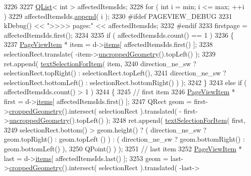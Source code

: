\begin{DoxyCode}
3226 
3227         \hyperlink{classQList}{QList}< \textcolor{keywordtype}{int} > affectedItemsIds;
3228         for ( \textcolor{keywordtype}{int} i = min; i <= max; ++i )
3229             affectedItemsIds.\hyperlink{generator__pdf_8cpp_af89a069d971b564171ae5c9bc238c420}{append}( i );
3230 \textcolor{preprocessor}{#ifdef PAGEVIEW\_DEBUG}
3231         kDebug() << \textcolor{stringliteral}{">>>> pages:"} << affectedItemsIds;
3232 \textcolor{preprocessor}{#endif}
3233         firstpage = affectedItemsIds.first();
3234 
3235         \textcolor{keywordflow}{if} ( affectedItemsIds.count() == 1 )
3236         \{
3237             \hyperlink{classPageViewItem}{PageViewItem} * item = d->\hyperlink{classPageViewPrivate_ad90c795dead9abfaa5818a94e00435bc}{items}[ affectedItemsIds.first() ];
3238             selectionRect.translate( -item->\hyperlink{classPageViewItem_a5d2e73a003f65b4e95c0c21b1698f835}{uncroppedGeometry}().topLeft() );
3239             ret.append( \hyperlink{classPageView_ace30a37c79e7cd9b523a6cd4fd74f5ae}{textSelectionForItem}( item,
3240                 direction\_ne\_sw ? selectionRect.topRight() : selectionRect.topLeft(),
3241                 direction\_ne\_sw ? selectionRect.bottomLeft() : selectionRect.bottomRight() ) );
3242         \}
3243         \textcolor{keywordflow}{else} \textcolor{keywordflow}{if} ( affectedItemsIds.count() > 1 )
3244         \{
3245             \textcolor{comment}{// first item}
3246             \hyperlink{classPageViewItem}{PageViewItem} * first = d->\hyperlink{classPageViewPrivate_ad90c795dead9abfaa5818a94e00435bc}{items}[ affectedItemsIds.first() ];
3247             QRect geom = first->\hyperlink{classPageViewItem_aa2c3e988ccbe9ee162b73d7f89ab0d02}{croppedGeometry}().intersect( selectionRect ).translated( -
      first->\hyperlink{classPageViewItem_a5d2e73a003f65b4e95c0c21b1698f835}{uncroppedGeometry}().topLeft() );
3248             ret.append( \hyperlink{classPageView_ace30a37c79e7cd9b523a6cd4fd74f5ae}{textSelectionForItem}( first,
3249                 selectionRect.bottom() > geom.height() ? ( direction\_ne\_sw ? geom.topRight() : geom.topLeft
      () ) : ( direction\_ne\_sw ? geom.bottomRight() : geom.bottomLeft() ),
3250                 QPoint() ) );
3251             \textcolor{comment}{// last item}
3252             \hyperlink{classPageViewItem}{PageViewItem} * last = d->\hyperlink{classPageViewPrivate_ad90c795dead9abfaa5818a94e00435bc}{items}[ affectedItemsIds.last() ];
3253             geom = last->\hyperlink{classPageViewItem_aa2c3e988ccbe9ee162b73d7f89ab0d02}{croppedGeometry}().intersect( selectionRect ).translated( -last->

\end{DoxyCode}
